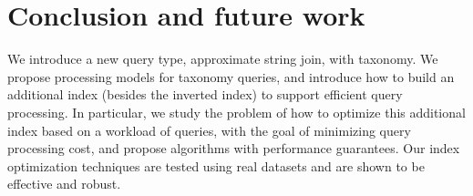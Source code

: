 \documentclass{sig-alternate}
\begin{document}
\section{Conclusion and future work}

We introduce a new query type, approximate string join, with taxonomy. We propose processing
models for taxonomy queries, and introduce how to build
an additional index (besides the inverted index) to support
efficient query processing. In particular, we study the problem
of how to optimize this additional index based on a
workload of queries, with the goal of minimizing query processing
cost, and propose algorithms with performance guarantees.
Our index optimization techniques are tested using
real datasets and are shown to be effective and robust.





\end{document}
